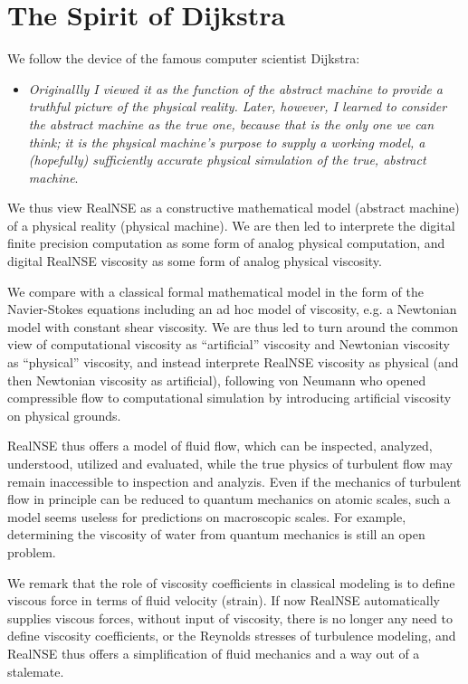 \section{The Spirit of Dijkstra}
We follow the device of the famous computer scientist Dijkstra: 
\begin{itemize}
\item \emph{Originallly I viewed it as the function of the abstract machine to provide a truthful picture of the physical reality. Later, however, I learned to consider the abstract machine as the \emph{true} one, because that is the only one we can think; it is the physical machine's purpose to supply a working model, a (hopefully) sufficiently accurate physical simulation of the true, abstract machine}.
\end{itemize}
We thus view RealNSE as a constructive mathematical model
(abstract machine) of a physical reality (physical machine).
We are then led to interprete the digital finite precision 
computation as some form of analog physical 
computation, and digital RealNSE viscosity as some form of analog 
physical viscosity.

We compare with a classical formal mathematical model  
in the form of the Navier-Stokes equations 
including an ad hoc model of viscosity, e.g. 
a Newtonian model with constant shear viscosity. 
We are thus led to turn around the common view of 
computational viscosity as ``artificial'' viscosity
and Newtonian viscosity as ``physical'' viscosity, and 
instead interprete RealNSE viscosity as physical (and then Newtonian viscosity as
artificial),  following von Neumann who opened compressible flow 
to computational simulation by introducing artificial viscosity
on physical grounds. 

RealNSE thus offers a model of fluid flow, which can be inspected,
analyzed, understood, utilized and evaluated, while the 
true physics of turbulent flow may remain inaccessible to inspection
and analyzis. Even if the mechanics of turbulent flow in principle
can be reduced to quantum mechanics on atomic scales, such a model
seems useless for predictions on macroscopic scales.
For example, determining the viscosity of water from 
quantum mechanics is still an open problem. 

We remark that the role of viscosity coefficients 
in classical modeling is to define viscous force in terms
of fluid velocity (strain). If now RealNSE automatically
supplies viscous forces, without input of viscosity,
there is no longer any need to define viscosity coefficients,
or the Reynolds stresses of turbulence modeling, and RealNSE thus offers 
a simplification of fluid mechanics and a way out of a stalemate.   
 
